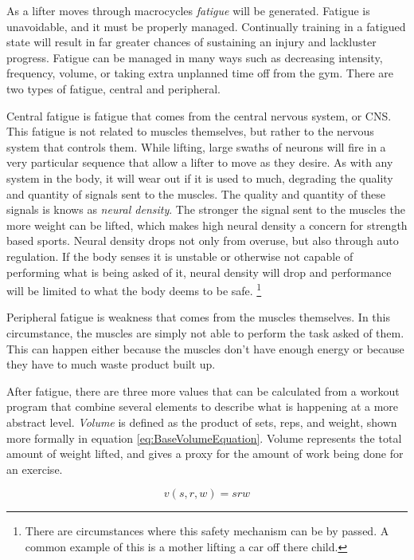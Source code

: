 As a lifter moves through macrocycles \textit{fatigue} will be generated. Fatigue is unavoidable, and it must be properly managed. Continually training in a fatigued state will result in far greater chances of sustaining an injury and lackluster progress. \cite{FATIGUE} Fatigue can be managed in many ways such as decreasing intensity, frequency, volume, or taking extra unplanned time off from the gym. There are two types of fatigue, central and peripheral.\cite{MEASURING_FATIGUE}

Central fatigue is fatigue that comes from the central nervous system, or CNS. This fatigue is not related to muscles themselves, but rather to the nervous system that controls them. While lifting, large swaths of neurons will fire in a very particular sequence that allow a lifter to move as they desire. As with any system in the body, it will wear out if it is used to much, degrading the quality and quantity of signals sent to the muscles. The quality and quantity of these signals is knows as \textit{neural density}. The stronger the signal sent to the muscles the more weight can be lifted, which makes high neural density a concern for strength based sports. Neural density drops not only from overuse, but also through auto regulation. If the body senses it is unstable or otherwise not capable of performing what is being asked of it, neural density will drop and performance will be limited to what the body deems to be safe. \footnote{There are circumstances where this safety mechanism can be by passed. A common example of this is a mother lifting a car off there child.} \cite{MEASURING_FATIGUE}

Peripheral fatigue is weakness that comes from the muscles themselves. In this circumstance, the muscles are simply not able to perform the task asked of them. This can happen either because the muscles don't have enough energy or because they have to much waste product built up. \cite{MEASURING_FATIGUE}

After fatigue, there are three more values that can be calculated from a workout program that combine several elements to describe what is happening at a more abstract level. \textit{Volume} is defined as the product of sets, reps, and weight, shown more formally in equation \ref{eq:BaseVolumeEquation}. Volume represents the total amount of weight lifted, and gives a proxy for the amount of work being done for an exercise.

\begin{equation}
    \label{eq:BaseVolumeEquation}
    v(s,r,w)=srw
\end{equation}

